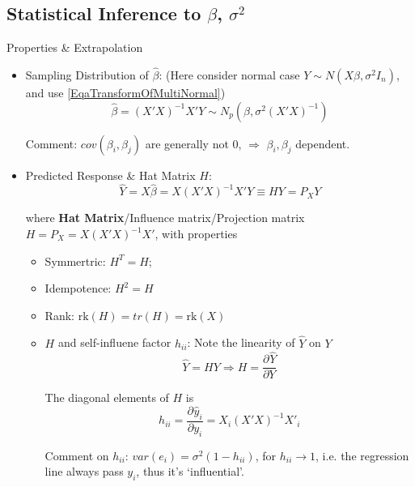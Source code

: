 \subsection{Statistical Inference to $ \beta  $, $ \sigma ^2 $}\label{SubSubSectionStatisticalInferenceInMultiLRA}
    Properties \& Extrapolation
\begin{itemize}[topsep=2pt,itemsep=2pt]
    \item Sampling Distribution of $ \hat{\beta } $: (Here consider normal case $ Y\sim N(X\beta ,\sigma^2I_n) $, and use \autoref{EqaTransformOfMultiNormal}) 
    \begin{equation}\label{EqaDistributionOfMultiVariateBeta}
        \hat{\beta }=(X'X)^{-1}X'Y \sim N_p(\beta,\sigma^2(X'X)^{-1})
    \end{equation}

    Comment: $ cov(\beta_i,\beta_j ) $ are generally not 0, $ \Rightarrow $ $ \beta _i,\beta _j $ dependent.
    \item Predicted Response \& Hat Matrix $ H $:
    \begin{equation}
        \hat{Y}=X\hat{\beta }=X(X'X)^{-1}X'Y\equiv  HY=P_XY
    \end{equation}

    where \textbf{Hat Matrix}/Influence matrix/Projection matrix $ H=P_X=X(X'X)^{-1}X' $, with properties
    \begin{itemize}[topsep=2pt,itemsep=2pt]
        \item Symmertric: $ H^T=H $;
        \item Idempotence: $ H^2=H $
        \item Rank: $ \mathrm{rk}(H)=tr(H)=\mathrm{rk}(X)   $
        \item $ H $ and self-influene factor $ h_{ii} $: Note the linearity of $ \hat{Y} $ on $ Y $
        \begin{equation}
            \hat{Y}=HY \Rightarrow H=\dfrac{\partial^{} \hat{Y}}{\partial Y^{}}
        \end{equation} 
    
        The diagonal elements of $ H $ is 
        \begin{equation}
            h_{ii}=\dfrac{\partial^{}\hat{y}_i}{\partial y_i^{}}=X_i(X'X)^{-1}X'_i
        \end{equation}

        Comment on $ h_{ii} $: $ var(e_i) =\sigma ^2(1-h_{ii})$, for $ h_{ii}\to 1 $, i.e. the regression line always pass $ y_i $, thus it's `influential'.
    \end{itemize}


\end{itemize}
